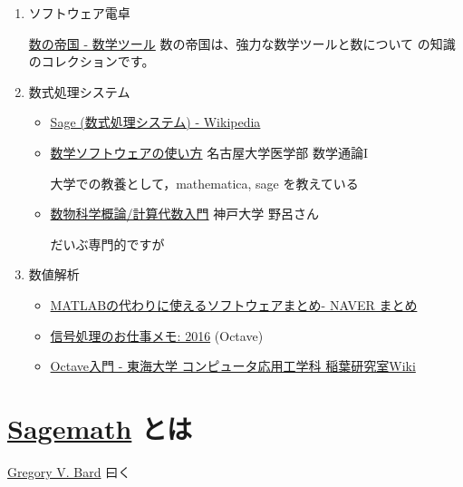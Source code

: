 \documentclass[dvipdfmx,11pt]{jarticle}
\begin{document}
\begin{enumerate}
\item ソフトウェア電卓  

\href{http://ja.numberempire.com/}{数の帝国 - 数学ツール} 数の帝国は、強力な数学ツールと数について
の知識のコレクションです。

\item 数式処理システム

\begin{itemize}
\item \href{https://ja.wikipedia.org/wiki/Sage\_(\%E6\%95\%B0\%E5\%BC\%8F\%E5\%87\%A6\%E7\%90\%86\%E3\%82\%B7\%E3\%82\%B9\%E3\%83\%86\%E3\%83\%A0)}{Sage (数式処理システム) - Wikipedia}

\item \href{https://www.math.nagoya-u.ac.jp/\~naito/lecture/2012\_SS.calc/software-1.pdf}{数学ソフトウェアの使い方} 名古屋大学医学部 数学通論I 

大学での教養として，mathematica, sage を教えている

\item \href{http://www.math.kobe-u.ac.jp/\~noro/subutsu05.pdf}{数物科学概論/計算代数入門} 神戸大学 野呂さん

だいぶ専門的ですが
\end{itemize}

\item 数値解析

\begin{itemize}
\item \href{https://matome.naver.jp/odai/2136163231573327601}{MATLABの代わりに使えるソフトウェアまとめ- NAVER まとめ}

\item \href{http://signalprocessor.blogspot.jp/2016/}{信号処理のお仕事メモ: 2016} (Octave)

\item \href{http://www.inaba-lab.org/wiki/index.php/Octave\%E5\%85\%A5\%E9\%96\%80}{Octave入門 - 東海大学 コンピュータ応用工学科 稲葉研究室Wiki}
\end{itemize}
\end{enumerate}


\section{\href{http://www.sagemath.org}{Sagemath} とは}
\label{sec:orgdf82f57}

\href{http://www.gregorybard.com/Sage.html}{Gregory V. Bard} 曰く
\end{document}
